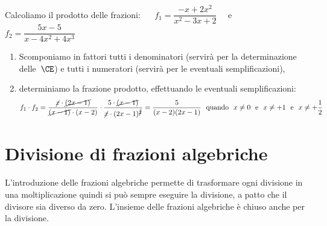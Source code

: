  \begin{esempio}
Calcoliamo il prodotto delle frazioni: ~~
\(f_{1}=\dfrac{-x+2x^2}{x^2-3x+2}\) ~~e~~ \(f_{2}=\dfrac{5x-5}{x-4x^2+4x^3}\)

\begin{enumerate}
 \item Scomponiamo in fattori tutti i denominatori (servirà per la 
 determinazione delle~\(\CE\)) e
    tutti i numeratori (servirà per le eventuali semplificazioni),
 \item determiniamo la frazione prodotto, effettuando le eventuali 
  semplificazioni:
\[f_1 \cdot f_2 = 
\dfrac{\cancel{x} \cdot \cancel{(2x-1)}}{\cancel{(x-1)} \cdot {(x-2)}} \cdot 
\dfrac{5\cdot\cancel{(x-1)}}{\cancel{x}\cdot(2x-1)^{\cancel{2}}}=
\dfrac{5}{(x-2)(2x-1)}
\text{~~quando~~} x \neq 0 \text{~~e~~} x \neq +1 \text{~~e~~} x \neq +\dfrac{1}{2}\]

\end{enumerate}
\end{esempio}


\section{Divisione di frazioni algebriche}
\label{sec:frazalg_divisione}

L'introduzione delle frazioni algebriche permette di trasformare ogni 
divisione in una moltiplicazione quindi si può sempre eseguire la divisione, 
a patto che il divisore sia diverso da zero.
L'insieme delle frazioni algebriche è chiuso anche per la divisione.

